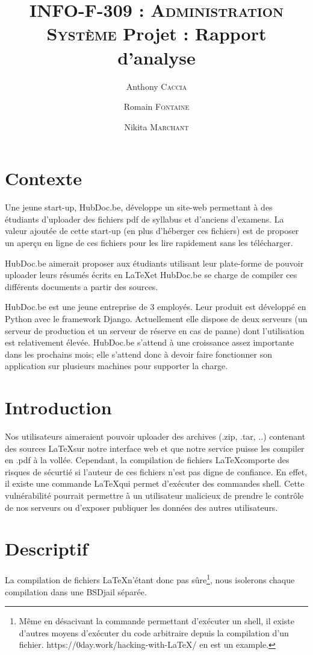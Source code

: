 \documentclass[10pt,a4paper]{article}
\author{Anthony \textsc{Caccia} \and Romain \textsc{Fontaine} \and Nikita \textsc{Marchant} }
\date{}
\title{\textsc{INFO-F-309 : Administration Système} Projet : Rapport d'analyse}
\begin{document}
\maketitle

\section{Contexte}

Une jeune start-up, HubDoc.be, développe un site-web permettant à des étudiants d'uploader des fichiers pdf de syllabus et d'anciens d'examens.
La valeur ajoutée de cette start-up (en plus d'héberger ces fichiers) est de proposer un aperçu en ligne de ces fichiers pour les lire rapidement sans les télécharger.

HubDoc.be aimerait proposer aux étudiants utilisant leur plate-forme de pouvoir uploader leurs résumés écrits en \LaTeX et HubDoc.be se charge de compiler ces différents documents a partir des sources.

HubDoc.be est une jeune entreprise de 3 employés.
Leur produit est développé en Python avec le framework Django.
Actuellement elle dispose de deux serveurs (un serveur de production et un serveur de réserve en cas de panne) dont l'utilisation est relativement élevée.
HubDoc.be s'attend à une croissance assez importante dans les prochains mois;
elle s'attend donc à devoir faire fonctionner son application sur plusieurs machines pour supporter la charge.


\section{Introduction}

Nos utilisateurs aimeraient pouvoir uploader des archives (.zip, .tar, ..) contenant des sources \LaTeX sur notre interface web et que notre service puisse les compiler en .pdf à la vollée.
Cependant, la compilation de fichiers \LaTeX comporte des risques de sécurtié si l'auteur de ces fichiers n'est pas digne de confiance.
En effet, il existe une commande \LaTeX qui permet d'exécuter des commandes shell.
Cette vulnérabilité pourrait permettre à un utilisateur malicieux de prendre le contrôle de nos serveurs ou d'exposer publiquer les données des autres utilisateurs.

\section{Descriptif}

La compilation de fichiers \LaTeX n'étant donc pas sûre\footnote{Même en désacivant la commande permettant d'exécuter un shell, il existe d'autres moyens d'exécuter du code arbitraire depuis la compilation d'un fichier. https://0day.work/hacking-with-LaTeX/ en est un example.}, nous isolerons chaque compilation dans une BSDjail séparée.
\end{document}
